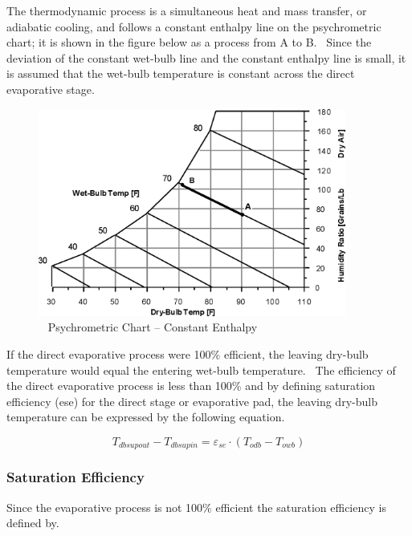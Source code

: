 The thermodynamic process is a simultaneous heat and mass transfer, or adiabatic cooling, and follows a constant enthalpy line on the psychrometric chart; it is shown in the figure below as a process from A to B.~ Since the deviation of the constant wet-bulb line and the constant enthalpy line is small, it is assumed that the wet-bulb temperature is constant across the direct evaporative stage.

\begin{figure}[hbtp] %
\centering
\includegraphics[width=0.9\textwidth, height=0.9\textheight, keepaspectratio=true]{media/image4790.png}
\caption{  Psychrometric Chart -- Constant Enthalpy \protect \label{fig:psychrometric-chart-constant-enthalpy}}
\end{figure}

If the direct evaporative process were 100\% efficient, the leaving dry-bulb temperature would equal the entering wet-bulb temperature.~ The efficiency of the direct evaporative process is less than 100\% and by defining saturation efficiency (ese) for the direct stage or evaporative pad, the leaving dry-bulb temperature can be expressed by the following equation.

\begin{equation}
{T_{dbsupout}} - {T_{dbsupin}} = {\varepsilon_{se}} \cdot \left( {{T_{odb}} - {T_{owb}}} \right)
\end{equation}

\subsubsection{Saturation Efficiency}\label{saturation-efficiency}

Since the evaporative process is not 100\% efficient the saturation efficiency is defined by.

